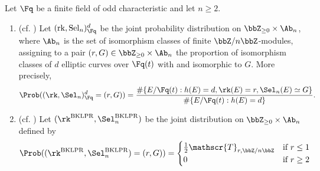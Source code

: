 \begin{definition} \label{definition:mordell_weil_rank_and_n_selmer_group_structure_probability_distribution_of_elliptic_curves_over_a_global_function_field_of_odd_characteristic}
    Let $\Fq$ be a finite field of odd characteristic and let $n \geq 2$. 
    \begin{enumerate}
        \item (cf. \cite[1.2.1, Definition 1.3]{feng_landesman_rains_gdsgecff}) Let $(\operatorname{rk}, \operatorname{Sel}_n)^d_{\Fq}$ be the joint probability distribution on $\bbZ_{\geq 0} \times \Ab_n$, where $\Ab_n$ is the set of isomorphism classes of finite $\bbZ/n\bbZ$-modules, assigning to a pair $(r,G) \in \bbZ_{\geq 0} \times \Ab_n$ the proportion of isomorphism classes of  $d$ elliptic curves over $\Fq(t)$ with  and  isomorphic to $G$. More precisely,
        $$\Prob((\rk, \Sel_n)^d_{\Fq} = (r,G)) = \frac{\# \{E/\Fq(t) : h(E) = d, \rk(E) = r, \Sel_n(E) \simeq G \}}{\#\{E/\Fq(t): h(E) = d\}}.$$

        \item (cf. \cite[Definition 5.12]{feng_landesman_rains_gdsgecff}) Let $(\rk^{\mathrm{BKLPR}}, \Sel_n^{\mathrm{BKLPR}})$ be the joint distribution on $\bbZ_{\geq 0} \times \Ab_n$ defined by 
        $$\Prob((\rk^{\mathrm{BKLPR}}, \Sel_n^{\mathrm{BKLPR}}) = (r,G)) = \begin{cases} \frac{1}{2} \mathscr{T}_{r, \bbZ/n\bbZ} & \text{if } r \leq 1\\ 0 &\text{if } r \geq 2\end{cases} $$

    \end{enumerate}
\end{definition}